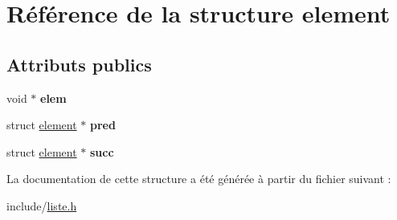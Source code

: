 \hypertarget{structelement}{}\section{Référence de la structure element}
\label{structelement}
\subsection*{Attributs publics}
\begin{DoxyCompactItemize}
\item 
\mbox{\label{structelement_af09e666501f69cf1d16423f6cc986e0a}} 
void $\ast$ {\bfseries elem}
\item 
\mbox{\label{structelement_a9f9ebee1fa1dce6d05bc325a66478635}} 
struct \hyperlink{structelement}{element} $\ast$ {\bfseries pred}
\item 
\mbox{\label{structelement_abe10f441a14a96bd130a004585b475ad}} 
struct \hyperlink{structelement}{element} $\ast$ {\bfseries succ}
\end{DoxyCompactItemize}


La documentation de cette structure a été générée à partir du fichier suivant \+:\begin{DoxyCompactItemize}
\item 
include/\hyperlink{liste_8h}{liste.\+h}\end{DoxyCompactItemize}
